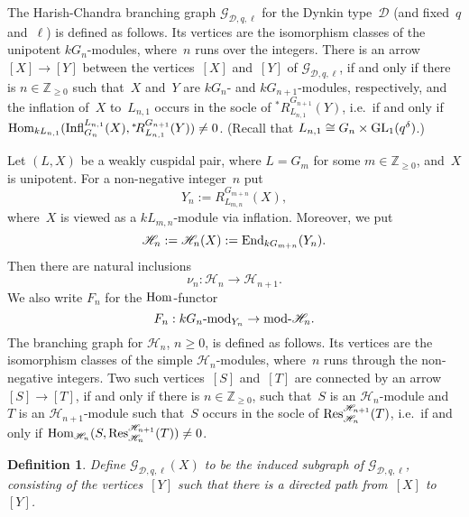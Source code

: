 \documentclass[twoside,12pt]{amsart}
\theoremstyle{plain}
\newtheorem{define}[num]{Definition}
\begin{document}
The Harish-Chandra branching graph $\mathcal{G}_{\mathcal{D},q,\ell}$ for the
Dynkin type~$\mathcal{D}$ (and fixed~$q$ and~$\ell$) is defined as follows. 
Its vertices are the 
isomorphism classes of the unipotent $kG_n$-modules, where~$n$ runs over the 
integers. There is an arrow $[X] \rightarrow [Y]$ between the vertices~$[X]$ 
and~$[Y]$ of $\mathcal{G}_{\mathcal{D},q,\ell}$, if and only if there is 
$n \in \mathbb{Z}_{\geq 0}$ such that~$X$ and~$Y$ are $kG_n$- and $kG_{n+1}$-modules, 
respectively, and the inflation of~$X$ to~$L_{n,1}$ occurs in the socle of 
${^*\!R}_{L_{n,1}}^{G_{n+1}}(Y)$, i.e.\ if and only if
${\mbox{\rm Hom}}_{kL_{n,1}}( {\mbox{\rm Infl}}_{G_{n}}^{L_{n,1}}( X ), {^*\!R}_{L_{n,1}}^{G_{n+1}}(Y) )
\neq 0$. (Recall that $L_{n,1} \cong G_n \times {\mbox{\rm GL}}_1(q^\delta)$.)

Let $(L,X)$ be a weakly cuspidal pair, where $L = G_m$ for some $m \in 
\mathbb{Z}_{\geq 0}$, and~$X$ is unipotent. For a non-negative integer~$n$ put
$$Y_n := R_{L_{m,n}}^{G_{m+n}}( X ),$$
where~$X$ is viewed as a $k{L_{m,n}}$-module via inflation. Moreover, we
put 
$$\mathscr{H}_n := \mathscr{H}_n(X) := {\mbox{\rm End}}_{kG_{m+n}}( Y_n ).$$
Then there are natural inclusions
$$\nu_n: \mathscr{H}_n \rightarrow \mathscr{H}_{n+1}.$$
We also write $F_n$ for the ${\mbox{\rm Hom}}$-functor 
$$F_n : kG_n\mbox{\rm -mod}_{Y_n} \rightarrow \mbox{\rm mod-}\mathscr{H}_n.$$
The branching graph for $\mathscr{H}_n$, $n \geq 0$, is defined as follows. 
Its vertices are
the isomorphism classes of the simple $\mathscr{H}_n$-modules, where~$n$
runs through the non-negative integers. Two such vertices~$[S]$ and~$[T]$ are
connected by an arrow $[S] \rightarrow [T]$, if and only if there is $n \in
\mathbb{Z}_{\geq 0}$, such that~$S$ is an $\mathscr{H}_n$-module and~$T$ is an
$\mathscr{H}_{n+1}$-module such that~$S$ occurs in the socle of 
${\mbox{\rm Res}}^{\mathscr{H}_{n+1}}_{\mathscr{H}_n}( T )$, i.e.\ if and only if
${\mbox{\rm Hom}}_{\mathscr{H}_n}( S, {\mbox{\rm Res}}^{\mathscr{H}_{n+1}}_{\mathscr{H}_n}( T ) ) 
\neq 0$.

\begin{define}
{\rm 
Define $\mathcal{G}_{\mathcal{D},q,\ell}( X )$ to be the induced subgraph of 
$\mathcal{G}_{\mathcal{D},q,\ell}$, consisting of the vertices~$[Y]$ such that 
there is a directed path from~$[X]$ to~$[Y]$. 
}
\end{define}
\end{document}
